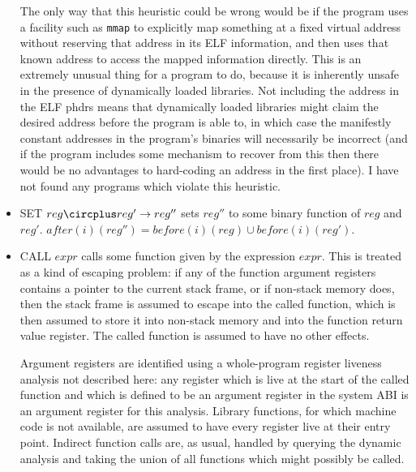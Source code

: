 \begin{itemize}
  The only way that this heuristic could be wrong would be if the
  program uses a facility such as \verb|mmap| to explicitly map
  something at a fixed virtual address without reserving that address
  in its ELF information, and then uses that known address to access
  the mapped information directly.  This is an extremely unusual thing
  for a program to do, because it is inherently unsafe in the presence
  of dynamically loaded libraries.  Not including the address in the
  ELF phdrs means that dynamically loaded libraries might claim the
  desired address before the program is able to, in which case the
  manifestly constant addresses in the program's binaries will
  necessarily be incorrect (and if the program includes some mechanism
  to recover from this then there would be no advantages to
  hard-coding an address in the first place).  I have not found any
  programs which violate this heuristic.

\item
  SET $reg \circplus reg' \rightarrow reg''$ sets $reg''$ to some
  binary function of $reg$ and $reg'$.  $after(i)(reg'') =
  before(i)(reg) \cup before(i)(reg')$.

\item
  CALL $expr$ calls some function given by the expression $expr$.
  This is treated as a kind of escaping problem: if any of the
  function argument registers contains a pointer to the current stack
  frame, or if non-stack memory does, then the stack frame is assumed
  to escape into the called function, which is then assumed to store
  it into non-stack memory and into the function return value
  register.  The called function is assumed to have no other
  effects.

  Argument registers are identified using a whole-program register
  liveness analysis not described here: any register which is live at
  the start of the called function and which is defined to be an
  argument register in the system ABI is an argument register for this
  analysis.  Library functions, for which machine code is not
  available, are assumed to have every register live at their entry
  point.  Indirect function calls are, as usual, handled by querying
  the dynamic analysis and taking the union of all functions which
  might possibly be called.
\end{itemize}

